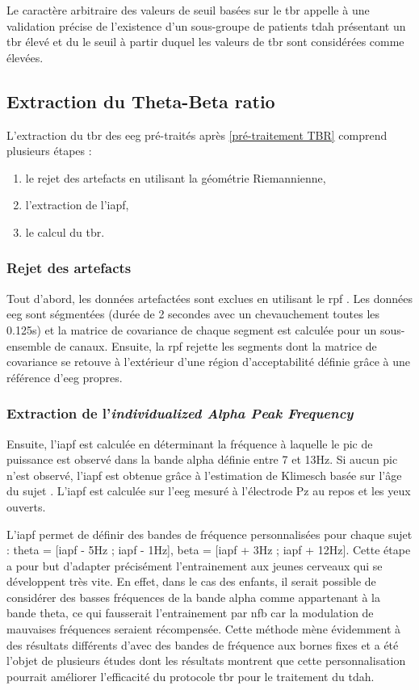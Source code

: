 Le caractère arbitraire des valeurs de seuil basées sur le \gls{tbr} appelle à une validation précise de l'existence d'un 
sous-groupe de patients \gls{tdah} présentant un \gls{tbr} élevé et du le seuil à partir duquel les valeurs de \gls{tbr} sont considérées comme élevées.  
 
\subsection{Extraction du Theta-Beta ratio}
L'extraction du \gls{tbr} des \gls{eeg} pré-traités après \ref{pré-traitement TBR} comprend plusieurs étapes :
\begin{enumerate}
\item le rejet des artefacts en utilisant la géométrie Riemannienne,
\item l'extraction de l'\gls{iapf},
\item le calcul du \gls{tbr}.
\end{enumerate}

\subsubsection{Rejet des artefacts}
Tout d'abord, les données artefactées sont exclues en utilisant le \gls{rpf} \citep{Barthelemy2019}. Les données \gls{eeg} sont ségmentées (durée de 2 secondes avec 
un chevauchement toutes les 0.125s) et la matrice de covariance de chaque segment est calculée pour un sous-ensemble de canaux. Ensuite, la \gls{rpf} rejette les 
segments dont la matrice de covariance se retouve à l'extérieur d'une région d'acceptabilité définie grâce à une référence d'\gls{eeg} propres. 

\subsubsection{Extraction de l'\textit{individualized Alpha Peak Frequency}}
Ensuite, l'\gls{iapf} est calculée en déterminant la fréquence à laquelle le pic de puissance est observé dans la bande alpha définie entre 7 et 13Hz. Si aucun pic n'est observé,
l'\gls{iapf} est obtenue grâce à l'estimation de Klimesch basée sur l'âge du sujet \citep{Klimesch1999}. L'\gls{iapf} est calculée sur l'\gls{eeg} mesuré à l'électrode Pz au repos
et les yeux ouverts. 

L'\gls{iapf} permet de définir des bandes de fréquence personnalisées pour chaque sujet : theta = [\gls{iapf} - 5Hz ; \gls{iapf} - 1Hz], beta = [\gls{iapf} + 3Hz ; \gls{iapf} + 12Hz].
Cette étape a pour but d'adapter précisément l'entrainement aux jeunes cerveaux qui se développent très vite. En effet, dans le cas des enfants, il serait possible de considérer 
des basses fréquences de la bande alpha comme appartenant à la bande theta, ce qui fausserait l'entrainement par \gls{nfb} car la modulation de mauvaises fréquences 
seraient récompensée. Cette méthode mène évidemment à des résultats différents d'avec des bandes de fréquence aux bornes fixes \citep{Arns2008, Vollebregt2015} et a été 
l'objet de plusieurs études \citep{Kaiser2001, Bazanova2006, Vollebregt2015} dont les résultats montrent que cette personnalisation pourrait améliorer l'efficacité du protocole
\gls{tbr} pour le traitement du \gls{tdah}.

